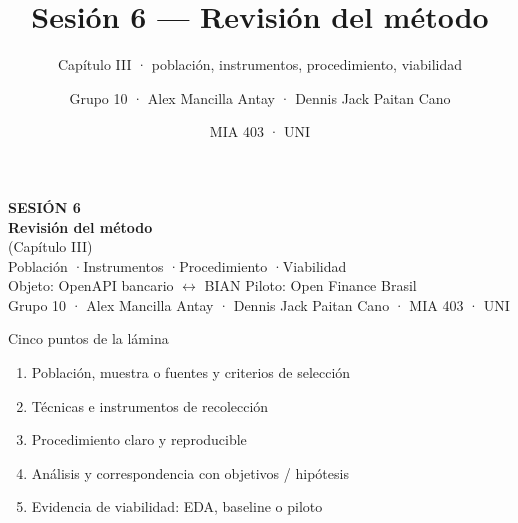 \documentclass[aspectratio=169,12pt]{beamer}
\title{Sesión 6 --- Revisión del método}
\subtitle{Capítulo III · población, instrumentos, procedimiento, viabilidad}
\author[Grupo 10 · Sesión 6 · objeto OpenAPI bancario · oct 2026]{Grupo 10 · Alex Mancilla Antay · Dennis Jack Paitan Cano}
\date{MIA 403 · UNI}
\begin{document}
\begin{frame}[plain]
  \vspace{1.1em}
  {\color{uniaccent}\large\bfseries SESIÓN 6}\\[0.85em]
  {\Huge\bfseries\color{white} Revisión del método}\\[0.25em]
  {\Large\color{white} (Capítulo III)}\\[1.15em]
  {\large\color{white} Población \quad\textcolor{uniaccent}{·}\quad Instrumentos \quad\textcolor{uniaccent}{·}\quad Procedimiento \quad\textcolor{uniaccent}{·}\quad Viabilidad}\\[1.3em]
  {\color{white!75} Objeto: OpenAPI bancario $\leftrightarrow$ BIAN \qquad Piloto: Open Finance Brasil}\\[0.35em]
  {\color{white!75} Grupo 10 · Alex Mancilla Antay · Dennis Jack Paitan Cano · MIA 403 · UNI}
\end{frame}

\begin{frame}{Cinco puntos de la lámina}
\vspace{0.4em}
\begin{enumerate}\itemsep0.7em
  \item Población, muestra o fuentes y criterios de selección
  \item Técnicas e instrumentos de recolección
  \item Procedimiento claro y reproducible
  \item Análisis y correspondencia con objetivos / hipótesis
  \item Evidencia de viabilidad: EDA, baseline o piloto
\end{enumerate}
\end{frame}
\end{document}
